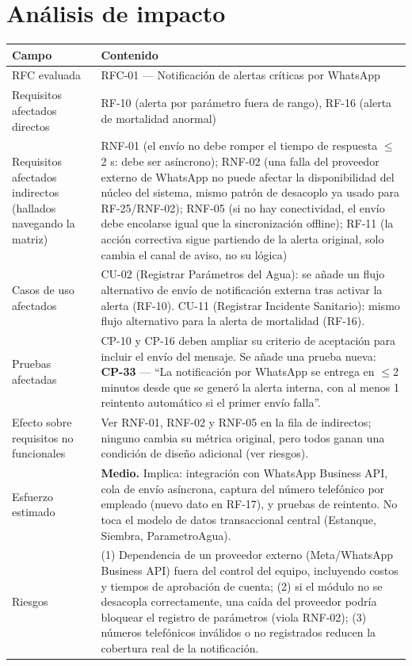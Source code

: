\documentclass[11pt,a4paper]{article}
\begin{document}
\section{Análisis de impacto}

\begin{longtable}{|p{4.5cm}|p{10cm}|}
\hline
\textbf{Campo} & \textbf{Contenido} \\ \hline
\endhead
RFC evaluada & RFC-01 — Notificación de alertas críticas por WhatsApp \\ \hline
Requisitos afectados directos & RF-10 (alerta por parámetro fuera de rango), RF-16 (alerta de mortalidad anormal) \\ \hline
Requisitos afectados indirectos (hallados navegando la matriz) &
RNF-01 (el envío no debe romper el tiempo de respuesta $\leq$2 s: debe ser asíncrono);
RNF-02 (una falla del proveedor externo de WhatsApp no puede afectar la disponibilidad del núcleo del sistema, mismo patrón de desacoplo ya usado para RF-25/RNF-02);
RNF-05 (si no hay conectividad, el envío debe encolarse igual que la sincronización offline);
RF-11 (la acción correctiva sigue partiendo de la alerta original, solo cambia el canal de aviso, no su lógica) \\ \hline
Casos de uso afectados & CU-02 (Registrar Parámetros del Agua): se añade un flujo alternativo de envío de notificación externa tras activar la alerta (RF-10). CU-11 (Registrar Incidente Sanitario): mismo flujo alternativo para la alerta de mortalidad (RF-16). \\ \hline
Pruebas afectadas & CP-10 y CP-16 deben ampliar su criterio de aceptación para incluir el envío del mensaje. Se añade una prueba nueva: \textbf{CP-33} — ``La notificación por WhatsApp se entrega en $\leq$2 minutos desde que se generó la alerta interna, con al menos 1 reintento automático si el primer envío falla''. \\ \hline
Efecto sobre requisitos no funcionales & Ver RNF-01, RNF-02 y RNF-05 en la fila de indirectos; ninguno cambia su métrica original, pero todos ganan una condición de diseño adicional (ver riesgos). \\ \hline
Esfuerzo estimado & \textbf{Medio.} Implica: integración con WhatsApp Business API, cola de envío asíncrona, captura del número telefónico por empleado (nuevo dato en RF-17), y pruebas de reintento. No toca el modelo de datos transaccional central (Estanque, Siembra, ParametroAgua). \\ \hline
Riesgos & (1) Dependencia de un proveedor externo (Meta/WhatsApp Business API) fuera del control del equipo, incluyendo costos y tiempos de aprobación de cuenta; (2) si el módulo no se desacopla correctamente, una caída del proveedor podría bloquear el registro de parámetros (viola RNF-02); (3) números telefónicos inválidos o no registrados reducen la cobertura real de la notificación. \\ \hline

\end{longtable}
\end{document}
